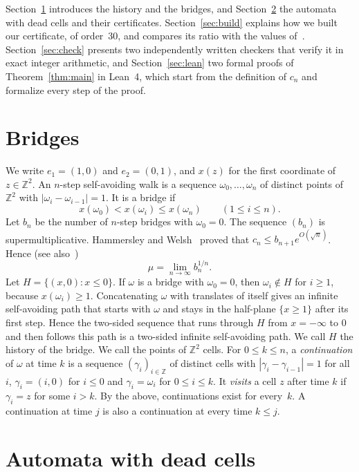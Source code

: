 \documentclass[11pt]{amsart}
\theoremstyle{definition}
\theoremstyle{remark}
\numberwithin{equation}{section}
\newcommand{\Z}{\mathbb{Z}}
\newcommand{\Kmax}{30}
\begin{document}
Section~\ref{sec:bridges} introduces the history and the bridges, and Section~\ref{sec:automata} the automata with dead cells and their certificates. Section~\ref{sec:build} explains how we built our certificate, of order~$\Kmax$, and compares its ratio with the values of~\cite{Cou25}. Section~\ref{sec:check} presents two independently written checkers that verify it in exact integer arithmetic, and Section~\ref{sec:lean} two formal proofs of Theorem~\ref{thm:main} in Lean~4, which start from the definition of $c_n$ and formalize every step of the proof.

\section{Bridges}\label{sec:bridges}

We write $e_1=(1,0)$ and $e_2=(0,1)$, and $x(z)$ for the first coordinate of $z\in\Z^2$. An $n$-step self-avoiding walk is a sequence $\omega_0,\dots,\omega_n$ of distinct points of $\Z^2$ with $|\omega_i-\omega_{i-1}|=1$. It is a bridge if
\[
x(\omega_0)<x(\omega_i)\le x(\omega_n)\qquad(1\le i\le n).
\]
Let $b_n$ be the number of $n$-step bridges with $\omega_0=0$. The sequence $(b_n)$ is supermultiplicative. Hammersley and Welsh~\cite{HW62} proved that $c_n\le b_{n+1}e^{O(\sqrt n)}$. Hence (see also~\cite[Section~3.1]{MS93})
\begin{equation}\label{eq:hw}
\mu=\lim_{n\to\infty}b_n^{1/n}.
\end{equation}
Let $H=\{(x,0):x\le0\}$. If $\omega$ is a bridge with $\omega_0=0$, then $\omega_i\notin H$ for $i\ge1$, because $x(\omega_i)\ge1$. Concatenating $\omega$ with translates of itself gives an infinite self-avoiding path that starts with $\omega$ and stays in the half-plane $\{x\ge1\}$ after its first step. Hence the two-sided sequence that runs through $H$ from $x=-\infty$ to $0$ and then follows this path is a two-sided infinite self-avoiding path. We call $H$ the history of the bridge. We call the points of $\Z^2$ cells. For $0\le k\le n$, a \emph{continuation} of $\omega$ at time $k$ is a sequence $(\gamma_i)_{i\in\Z}$ of distinct cells with $|\gamma_i-\gamma_{i-1}|=1$ for all $i$, $\gamma_i=(i,0)$ for $i\le0$ and $\gamma_i=\omega_i$ for $0\le i\le k$. It \emph{visits} a cell $z$ after time $k$ if $\gamma_i=z$ for some $i>k$. By the above, continuations exist for every~$k$. A continuation at time $j$ is also a continuation at every time $k\le j$.

\section{Automata with dead cells}\label{sec:automata}
\end{document}
